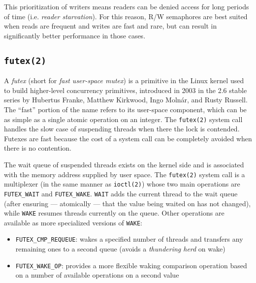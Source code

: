 This prioritization of writers means readers can be denied access for long
periods of time (i.e. \textit{reader starvation}).  For this reason, R/W
semaphores are best suited when reads are frequent and writes are fast and rare,
but can result in significantly better performance in those cases.

\subsection{\texttt{futex(2)}}

A \textit{futex} (short for \textit{fast user-space mutex}) is a primitive in
the Linux kernel used to build higher-level concurrency primitives, introduced
in 2003 in the 2.6 stable series by Hubertus Franke, Matthew Kirkwood, Ingo
Molnár, and Rusty Russell.  The ``fast'' portion of the name refers to its
user-space component, which can be as simple as a single atomic operation on an
integer.  The \texttt{futex(2)} system call handles the slow case of suspending
threads when there the lock is contended.  Futexes are fast because the cost of
a system call can be completely avoided when there is no
contention.\footnotemark


The wait queue of suspended threads exists on the kernel side and is associated
with the memory address supplied by user space.  The \texttt{futex(2)} system
call is a multiplexer (in the same manner as \texttt{ioctl(2)}) whose two main
operations are \texttt{FUTEX\_WAIT} and \texttt{FUTEX\_WAKE}.  \texttt{WAIT}
adds the current thread to the wait queue (after ensuring --- atomically ---
that the value being waited on has not changed), while \texttt{WAKE} resumes
threads currently on the queue.  Other operations are available as more
specialized versions of \texttt{WAKE}:

\begin{itemize}
    \item \texttt{FUTEX\_CMP\_REQUEUE}:
        wakes a specified number of threads and transfers any remaining ones to
        a second queue (avoids a \textit{thundering herd} on wake)
    \item \texttt{FUTEX\_WAKE\_OP}:
        provides a more flexible waking comparison operation based on a number
        of available operations on a second value
\end{itemize}

